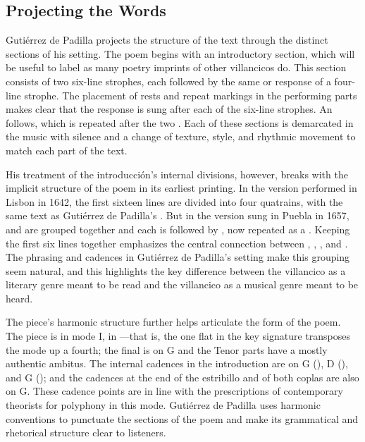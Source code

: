 \subsection{Projecting the Words}

Gutiérrez de Padilla projects the structure of the text through the distinct
sections of his setting.
The poem begins with an introductory section, which will be useful to label
 as many poetry imprints of other villancicos do.
This section consists of two six-line strophes, each followed by the same
 or response of a four-line strophe.
The placement of rests and repeat markings in the performing parts makes clear
that the response is sung after each of the six-line strophes.
An  follows, which is repeated after the two .
Each of these sections is demarcated in the music with silence and a change of
texture, style, and rhythmic movement to match each part of the text.


His treatment of the introducción's internal divisions, however, breaks with
the implicit structure of the poem in its earliest printing.
In the version performed in Lisbon in 1642, the first sixteen lines are divided
into four quatrains, with the same text as Gutiérrez de Padilla's
.
But in the version sung in Puebla in 1657,  and
 are grouped together and each is followed by
, now repeated as a .
Keeping the first six lines together emphasizes the central connection between
, , , and
.
The phrasing and cadences in Gutiérrez de Padilla's setting make this grouping
seem natural, and this highlights the key difference between the villancico as a
literary genre meant to be read and the villancico as a musical genre meant to
be heard.


The piece's harmonic structure further helps articulate the form of the poem.
The piece is in mode I, in ---that is, the one flat in the
key signature transposes the mode up a fourth; the final is on G and the Tenor
parts have a mostly authentic ambitus.
The internal cadences in the introduction are on G (), D
(), and G (); and the cadences at the end of the
estribillo and of both coplas are also on G.
These cadence points are in line with the prescriptions of contemporary
theorists for polyphony in this mode.%
    \Autocites
    [873--882, 883--885, 907--912]{Cerone:Melopeo}
    [364--406]{Judd:RenaissanceModalTheory}
    {Barnett:TonalOrganization17C}
Gutiérrez de Padilla uses harmonic conventions to punctuate the sections of the
poem and make its grammatical and rhetorical structure clear to listeners.

